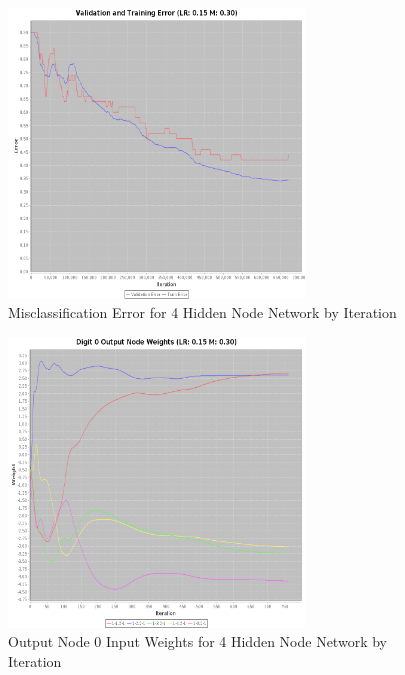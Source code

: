 \documentclass{article}
\begin{document}
\begin{figure}
\centering
\includegraphics[width=0.7\textwidth]{data/final/4_hidden_node_error.png}
\caption{Misclassification Error for 4 Hidden Node Network by Iteration}
\label{error4}
\end{figure}

\begin{figure}
\centering
\includegraphics[width=0.7\textwidth]{data/final/4_hidden_node_0weight.png}
\caption{Output Node 0 Input Weights for 4 Hidden Node Network by Iteration}
\label{weight4}
\end{figure}
\end{document}
